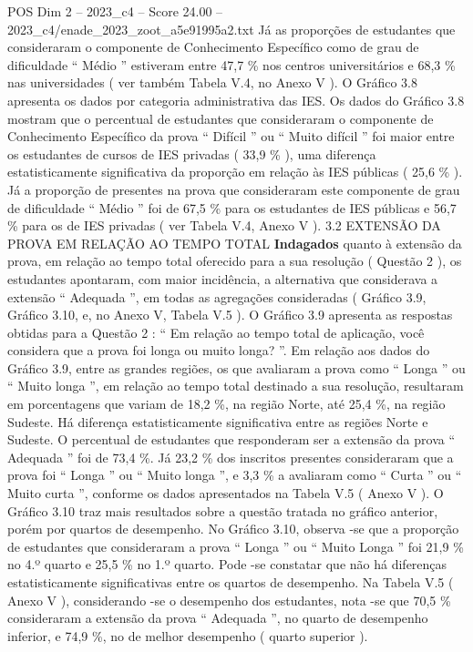 \begin{textsample}{POS Dim 2 – 2023\_c4 – Score 24.00 – 2023\_c4/enade\_2023\_zoot\_a5e91995a2.txt}
Já as proporções de estudantes que consideraram o componente de Conhecimento Específico como de grau de dificuldade “ Médio ” estiveram entre 47,7 \% nos centros universitários e 68,3 \% nas universidades ( ver também Tabela V.4, no Anexo V ).
O Gráfico 3.8 apresenta os dados por categoria administrativa das IES.
Os dados do Gráfico 3.8 mostram que o percentual de estudantes que consideraram o componente de Conhecimento Específico da prova “ Difícil ” ou “ Muito difícil ” foi maior entre os estudantes de cursos de IES privadas ( 33,9 \% ), uma diferença estatisticamente significativa da proporção em relação às IES públicas ( 25,6 \% ).
Já a proporção de presentes na prova que consideraram este componente de grau de dificuldade “ Médio ” foi de 67,5 \% para os estudantes de IES públicas e 56,7 \% para os de IES privadas ( ver Tabela V.4, Anexo V ). 3.2 EXTENSÃO DA PROVA EM RELAÇÃO AO TEMPO TOTAL \textbf{Indagados} quanto à extensão da prova, em relação ao tempo total oferecido para a sua resolução ( Questão 2 ), os estudantes apontaram, com maior incidência, a alternativa que considerava a extensão “ Adequada ”, em todas as agregações consideradas ( Gráfico 3.9, Gráfico 3.10, e, no Anexo V, Tabela V.5 ).
O Gráfico 3.9 apresenta as respostas obtidas para a Questão 2 : “ Em relação ao tempo total de aplicação, você considera que a prova foi longa ou muito longa? ”.
Em relação aos dados do Gráfico 3.9, entre as grandes regiões, os que avaliaram a prova como “ Longa ” ou “ Muito longa ”, em relação ao tempo total destinado a sua resolução, resultaram em porcentagens que variam de 18,2 \%, na região Norte, até 25,4 \%, na região Sudeste.
Há diferença estatisticamente significativa entre as regiões Norte e Sudeste.
O percentual de estudantes que responderam ser a extensão da prova “ Adequada ” foi de 73,4 \%.
Já 23,2 \% dos inscritos presentes consideraram que a prova foi “ Longa ” ou “ Muito longa ”, e 3,3 \% a avaliaram como “ Curta ” ou “ Muito curta ”, conforme os dados apresentados na Tabela V.5 ( Anexo V ).
O Gráfico 3.10 traz mais resultados sobre a questão tratada no gráfico anterior, porém por quartos de desempenho.
No Gráfico 3.10, observa -se que a proporção de estudantes que consideraram a prova “ Longa ” ou “ Muito Longa ” foi 21,9 \% no 4.º quarto e 25,5 \% no 1.º quarto.
Pode -se constatar que não há diferenças estatisticamente significativas entre os quartos de desempenho.
Na Tabela V.5 ( Anexo V ), considerando -se o desempenho dos estudantes, nota -se que 70,5 \% consideraram a extensão da prova “ Adequada ”, no quarto de desempenho inferior, e 74,9 \%, no de melhor desempenho ( quarto superior ).

\end{textsample}

